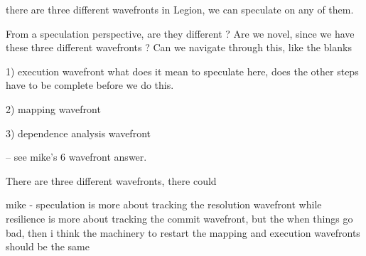 

there are three different wavefronts in Legion, we can speculate on any of them. 


From a speculation perspective, are they different ? 
Are we novel, since we have these three different wavefronts ? 
Can we navigate through this, like the blanks 


1) execution wavefront 
what does it mean to speculate here, does the other steps have to be complete before we do this. 


2) mapping wavefront

3) dependence analysis wavefront


-- see mike's 6 wavefront answer.

There are three different wavefronts, there could

 
mike - speculation is more about tracking the resolution wavefront while resilience is more about tracking the commit wavefront, but the when things go bad, then i think the machinery to restart the mapping and execution wavefronts should be the same
